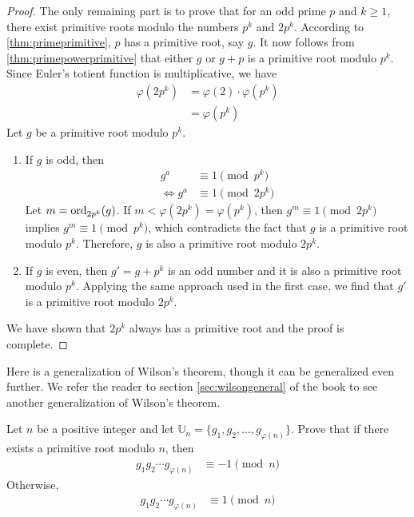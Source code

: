 \begin{proof}
	The only remaining part is to prove that for an odd prime $p$ and $k \geq 1$, there exist primitive roots modulo the numbers $p^k$ and $2p^k$. According to \autoref{thm:primeprimitive}, $p$ has a primitive root, say $g$. It now follows from \autoref{thm:primepowerprimitive} that either $g$ or $g+p$ is a primitive root modulo $p^k$. Since Euler's totient function is multiplicative, we have
		\begin{align*}
			\varphi(2p^k)
				& = \varphi(2)\cdot \varphi(p^k)\\
				& = \varphi(p^k)
		\end{align*}
	Let $g$ be a primitive root modulo $p^k$.
	\begin{enumerate}
		\item If $g$ is odd, then
		\begin{align*}
			g^a
				& \equiv 1 \pmod{p^k}\\
			\iff g^a
				& \equiv 1 \pmod{2p^k}
		\end{align*}
		Let $m = \operatorname{ord}_{2p^k}(g)$. If $m<\varphi(2p^k)=\varphi(p^k)$, then $g^m \equiv 1\pmod{2p^k}$ implies $g^m \equiv 1\pmod{p^k}$, which contradicts the fact that $g$ is a primitive root modulo $p^k$. Therefore, $g$ is also a primitive root modulo $2p^k$.
		\item If $g$ is even, then $g'=g+p^k$ is an odd number and it is also a primitive root modulo $p^k$. Applying the same approach used in the first case, we find that $g'$ is a primitive root modulo $2p^k$.
	\end{enumerate}
	We have shown that $2p^k$ always has a primitive root and the proof is complete.
\end{proof}

Here is a generalization of Wilson's theorem, though it can be generalized even further. We refer the reader to section \eqref{sec:wilsongeneral} of the book to see another generalization of Wilson's theorem.
\begin{problem}\label{thm:genWilson}
	Let $n$ be a positive integer and let $\mathbb U_n = \{g_1, g_2, \ldots, g_{\varphi(n)}\}$. Prove that if there exists a primitive root modulo $n$, then
		\begin{align*}
			g_1g_2\cdots g_{\varphi(n)}
				& \equiv-1\pmod n
		\end{align*}
	Otherwise,
		\begin{align*}
			g_1g_2\cdots g_{\varphi(n)}
				& \equiv1\pmod n
		\end{align*}
\end{problem}

